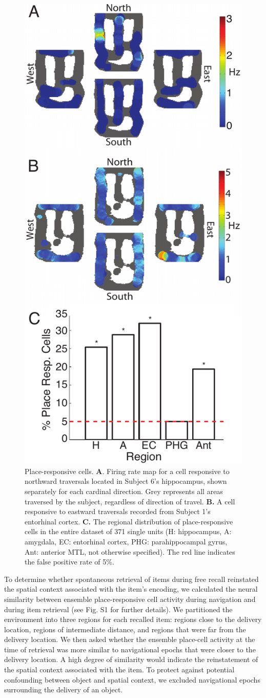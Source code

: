 \begin{figure}
\centering
    \includegraphics[width=.5\textwidth]{./tex/dboy/figs/fig2}
  \caption[Place-responsive cells]{Place-responsive cells.  \textbf{A}. Firing rate map for a cell responsive to northward traversals located in Subject 6's hippocampus, shown separately for each cardinal direction. Grey represents all areas traversed by the subject, regardless of direction of travel. \textbf{B.} A cell responsive to eastward traversals recorded from Subject 1's entorhinal cortex. \textbf{C.} The regional distribution of place-responsive cells in the entire dataset of 371 single units (H: hippocampus, A: amygdala, EC: entorhinal cortex, PHG: parahippocampal gyrus, Ant: anterior MTL, not otherwise specified).  The red line indicates the false positive rate of 5\%.}
\label{fig:place_ex}
\end{figure}

To determine whether spontaneous retrieval of items during free recall reinstated the spatial context associated with the item's encoding, we calculated the neural similarity between ensemble place-responsive cell activity during navigation and during item retrieval (see Fig. S1 for further details).  We partitioned the environment into three regions for each recalled item: regions close to the delivery location, regions of intermediate distance, and regions that were far from the delivery location.  We then asked whether the ensemble place-cell activity at the time of retrieval was more similar to navigational epochs that were closer to the delivery location.  A high degree of similarity would indicate the reinstatement of the spatial context associated with the item.  To protect against potential confounding between object and spatial context, we excluded navigational epochs surrounding the delivery of an object.  

